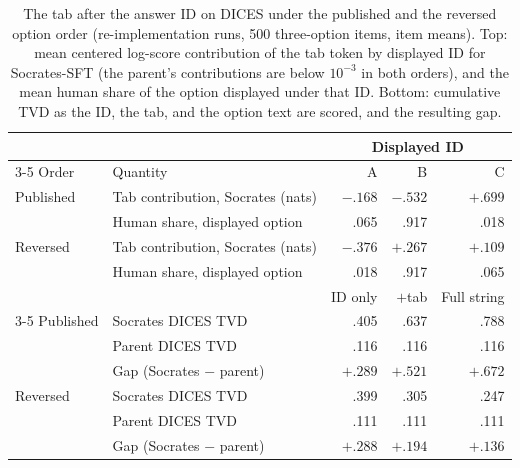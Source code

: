 \begin{table}[!htb]
\centering\scriptsize
\setlength{\tabcolsep}{2.5pt}
\begin{tabular}{@{}llrrr@{}}
\toprule
& & \multicolumn{3}{c}{Displayed ID} \\
\cmidrule(l){3-5}
Order & Quantity & A & B & C \\
\midrule
Published & Tab contribution, Socrates (nats) & $-.168$ & $-.532$ & $+.699$ \\
 & Human share, displayed option & .065 & .917 & .018 \\
Reversed & Tab contribution, Socrates (nats) & $-.376$ & $+.267$ & $+.109$ \\
 & Human share, displayed option & .018 & .917 & .065 \\
\midrule
& & ID only & $+$tab & Full string \\
\cmidrule(l){3-5}
Published & Socrates DICES TVD & .405 & .637 & .788 \\
 & Parent DICES TVD & .116 & .116 & .116 \\
 & Gap (Socrates $-$ parent) & $+.289$ & $+.521$ & $+.672$ \\
Reversed & Socrates DICES TVD & .399 & .305 & .247 \\
 & Parent DICES TVD & .111 & .111 & .111 \\
 & Gap (Socrates $-$ parent) & $+.288$ & $+.194$ & $+.136$ \\
\bottomrule
\end{tabular}
\caption{The tab after the answer ID on DICES under the published and the reversed option order (re-implementation runs, 500 three-option items, item means). Top: mean centered log-score contribution of the tab token by displayed ID for Socrates-SFT (the parent's contributions are below $10^{-3}$ in both orders), and the mean human share of the option displayed under that ID. Bottom: cumulative TVD as the ID, the tab, and the option text are scored, and the resulting gap.}
\label{tab:reversed-tab}
\end{table}
